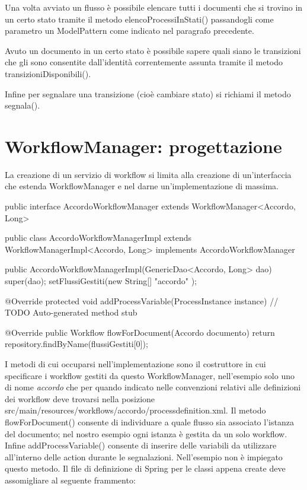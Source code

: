 Una volta avviato un flusso è possibile elencare tutti i documenti che si trovino in un certo stato tramite il metodo  elencoProcessiInStati() passandogli come parametro un ModelPattern come indicato nel paragrafo precedente.

Avuto un documento in un certo stato è possibile sapere quali siano le transizioni che gli sono consentite dall'identità correntemente assunta tramite il metodo  transizioniDisponibili().

Infine per segnalare una transizione (cioè cambiare stato) si richiami il metodo  segnala().


\section{WorkflowManager: progettazione}

La creazione di un servizio di workflow si limita alla creazione di un'interfaccia che estenda WorkflowManager e nel darne un'implementazione di massima.

\begin{java}

public interface AccordoWorkflowManager 
 extends WorkflowManager<Accordo, Long> {
}

public class AccordoWorkflowManagerImpl 
extends WorkflowManagerImpl<Accordo, Long> 
implements AccordoWorkflowManager 
{

  public AccordoWorkflowManagerImpl(GenericDao<Accordo, Long> dao) {
    super(dao);
    setFlussiGestiti(new String[] { "accordo" });
  }

  @Override
  protected void addProcessVariable(ProcessInstance instance) {
    // TODO Auto-generated method stub
  }

  @Override
  public Workflow flowForDocument(Accordo documento) {
    return repository.findByName(flussiGestiti[0]);
  }
  
}

\end{java}


I metodi di cui occuparsi nell'implementazione sono il costruttore in cui specificare i workflow gestiti da questo WorkflowManager, nell'esempio solo uno di nome \textit{accordo} che per quando indicato nelle convenzioni relativi alle definizioni dei workflow deve trovarsi nella posizione src/main/resources/workflows/accordo/processdefinition.xml.
Il metodo flowForDocument() consente di individuare a quale flusso sia associato l'istanza del documento; nel nostro esempio ogni istanza è gestita da un solo workflow.
Infine addProcessVariable() consente di inserire delle variabili da utilizzare all'interno delle action durante le segnalazioni. Nell'esempio non è impiegato questo metodo.
Il file di definizione di Spring per le classi appena create deve assomigliare al seguente frammento:

